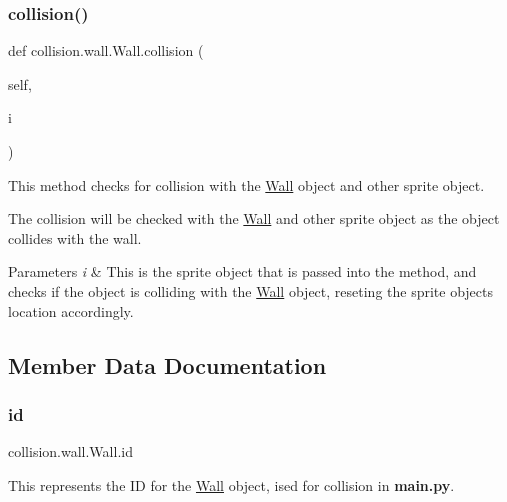 \subsubsection{\texorpdfstring{collision()}{collision()}}
{\footnotesize\ttfamily def collision.\+wall.\+Wall.\+collision (\begin{DoxyParamCaption}\item[{}]{self,  }\item[{}]{i }\end{DoxyParamCaption})}



This method checks for collision with the \hyperlink{classcollision_1_1wall_1_1_wall}{Wall} object and other sprite object. 

The collision will be checked with the \hyperlink{classcollision_1_1wall_1_1_wall}{Wall} and other sprite object as the object collides with the wall. 
\begin{DoxyParams}{Parameters}
{\em i} & This is the sprite object that is passed into the method, and checks if the object is colliding with the \hyperlink{classcollision_1_1wall_1_1_wall}{Wall} object, reseting the sprite objects location accordingly. \\
\hline
\end{DoxyParams}


\subsection{Member Data Documentation}
\mbox{\label{classcollision_1_1wall_1_1_wall_aacfb0da0a2fa307f54a571348a0df427}} 
\subsubsection{\texorpdfstring{id}{id}}
{\footnotesize\ttfamily collision.\+wall.\+Wall.\+id}



This represents the ID for the \hyperlink{classcollision_1_1wall_1_1_wall}{Wall} object, ised for collision in {\bfseries main.\+py}. 

\mbox{\label{classcollision_1_1wall_1_1_wall_ac5d61504c644c284d3fb0b67e9bcc1c3}} 
